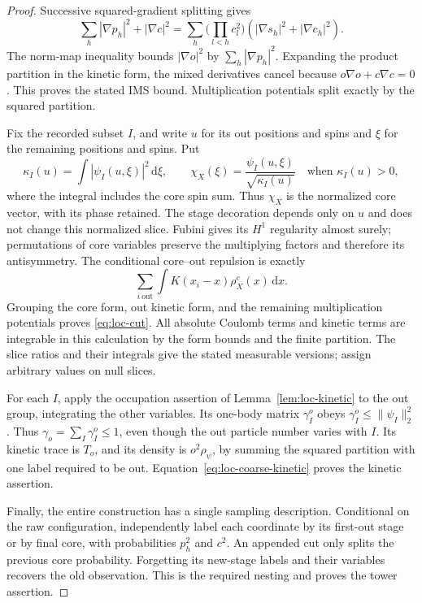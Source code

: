 \begin{proof}
Successive squared-gradient splitting gives
\[
 \sum_h|\nabla p_h|^2+|\nabla c|^2
 =\sum_h\Big(\prod_{l<h}c_l^2\Big)
                 (|\nabla s_h|^2+|\nabla c_h|^2).
\]
The norm-map inequality bounds $|\nabla o|^2$ by
$\sum_h|\nabla p_h|^2$.  Expanding the product partition in the
kinetic form, the mixed derivatives cancel because
$o\nabla o+c\nabla c=0$.  This proves the stated IMS bound.
Multiplication potentials split exactly by the squared partition.

Fix the recorded subset $I$, and write $u$ for its out positions and
spins and $\xi$ for the remaining positions and spins.  Put
\[
 \kappa_I(u)=\int|\psi_I(u,\xi)|^2\,\mathrm d\xi,
 \qquad
 \chi_X(\xi)=\frac{\psi_I(u,\xi)}{\sqrt{\kappa_I(u)}}
 \quad\text{when }\kappa_I(u)>0,
\]
where the integral includes the core spin sum.  Thus $\chi_X$ is the
normalized core vector, with its phase retained.  The stage decoration
depends only on $u$ and does not change this normalized slice.
Fubini gives its $H^1$ regularity almost surely; permutations of core
variables preserve the multiplying factors and therefore its antisymmetry.
The conditional core--out repulsion is exactly
\[
 \sum_{i\ \mathrm{out}}\int K(x_i-x)\rho_X^c(x)\,\mathrm dx.
\]
Grouping the core form, out kinetic form, and the remaining
multiplication potentials proves \eqref{eq:loc-cut}.  All absolute
Coulomb terms and kinetic terms are integrable in this calculation
by the form bounds and the finite partition.  The slice ratios and
their integrals give the stated measurable versions; assign arbitrary
values on null slices.

For each $I$, apply the occupation assertion of
Lemma~\ref{lem:loc-kinetic} to the out group, integrating the other
variables.  Its one-body matrix $\gamma_I^o$ obeys
$\gamma_I^o\leq\|\psi_I\|_2^2$.  Thus
$\gamma_o=\sum_I\gamma_I^o\leq1$, even though the out particle number
varies with $I$.  Its kinetic trace is $T_o$, and its density is
$o^2\rho_\psi$, by summing the squared partition with one label
required to be out.  Equation~\eqref{eq:loc-coarse-kinetic} proves the
kinetic assertion.

Finally, the entire construction has a single sampling description.
Conditional on the raw configuration, independently label each
coordinate by its first-out stage or by final core, with probabilities
$p_h^2$ and $c^2$.  An appended cut only splits the previous core
probability.  Forgetting its new-stage labels and their variables
recovers the old observation.  This is the required nesting and
proves the tower assertion.
\end{proof}

